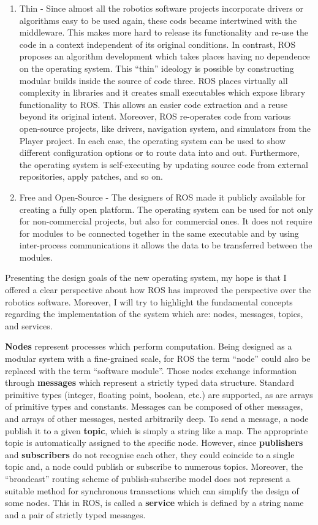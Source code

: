 \begin{enumerate}
\item Thin - Since almost all the robotics software projects incorporate drivers or algorithms easy to be used again,
these cods became intertwined with the middleware. This makes more hard to release its functionality and re-use the code
in a context independent of its original conditions. In contrast, ROS proposes an algorithm development which takes places
having no dependence on the operating system. This “thin” ideology is possible by constructing modular builds inside the
source of code three. ROS places virtually all complexity in libraries and it creates small executables which expose library
functionality to ROS. This allows an easier code extraction and a reuse beyond its original intent. 
Moreover, ROS re-operates code from various open-source projects, like drivers, navigation system, and simulators from the
Player project. In each case, the operating system can be used to show different configuration options or to route data into
and out. Furthermore, the operating system is self-executing by updating source code from external repositories, apply patches, and so on.

\item Free and Open-Source - The designers of ROS made it publicly available for creating a fully open platform.
The operating system can be used for not only for non-commercial projects, but also for commercial ones. It does 
not require for modules to be connected together in the same executable and by using inter-process communications it
allows the data to be transferred between the modules. 
\end{enumerate}


Presenting the design goals of the new operating system, my hope is that I offered a clear perspective about how ROS
has improved the perspective over the robotics software. Moreover, I will try to highlight the fundamental concepts 
regarding the implementation of the system which are: nodes, messages, topics, and services. 

\textbf{Nodes} represent processes which perform computation. Being designed as a modular system with a fine-grained scale,
for ROS the term “node” could also be replaced with the term “software module”. Those nodes exchange information
through \textbf{messages} which represent a strictly typed data structure. Standard primitive types (integer, floating point,
boolean, etc.) are supported, as are arrays of primitive types and constants. Messages can be composed of other messages,
and arrays of other messages, nested arbitrarily deep. To send a message, a node publish it to a given \textbf{topic}, which is simply
a string like a map. The appropriate topic is automatically assigned to the specific node. However, since \textbf{publishers} and
\textbf{subscribers} do not recognise each other, they could coincide to a single topic and, a node could publish or subscribe to numerous
topics. Moreover, the “broadcast” routing scheme of publish-subscribe model does not represent a suitable method for synchronous
transactions which can simplify the design of some nodes. This in ROS, is called a \textbf{service} which is defined by a string name and
a pair of strictly typed messages.

